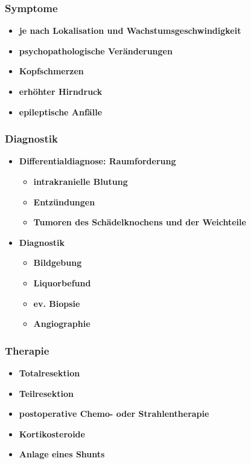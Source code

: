 		\subsubsection{Symptome}
			\begin{itemize}
				\item \textbf{je nach Lokalisation und Wachstumsgeschwindigkeit}
				\item \textbf{psychopathologische Veränderungen}
				\item \textbf{Kopfschmerzen}
				\item \textbf{erhöhter Hirndruck}
				\item \textbf{epileptische Anfälle}
			\end{itemize}
		\subsubsection{Diagnostik}
			\begin{itemize}
				\item \textbf{Differentialdiagnose: Raumforderung}
					\begin{itemize}
						\item \textbf{intrakranielle Blutung}
						\item \textbf{Entzündungen}
						\item \textbf{Tumoren des Schädelknochens und der Weichteile} 
					\end{itemize}
				\item \textbf{Diagnostik}
					\begin{itemize}
						\item \textbf{Bildgebung}
						\item \textbf{Liquorbefund}
						\item \textbf{ev. Biopsie}
						\item \textbf{Angiographie}
					\end{itemize}
			\end{itemize}
		\subsubsection{Therapie}
			\begin{itemize}
				\item \textbf{Totalresektion}
				\item \textbf{Teilresektion}
				\item \textbf{postoperative Chemo- oder Strahlentherapie}
				\item \textbf{Kortikosteroide}
				\item \textbf{Anlage eines Shunts}
			\end{itemize}
